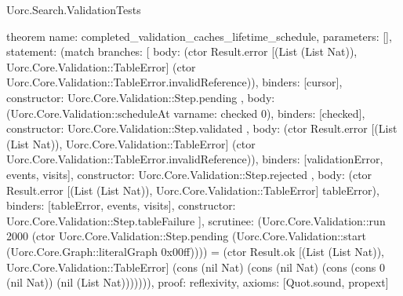 \begin{lexlean}{Uorc.Search.ValidationTests}
\begin{semanticmodule}
theorem{
  name: completed_validation_caches_lifetime_schedule,
  parameters: [],
  statement: (match{
    branches: [
      {
        body: (ctor Result.error [(List (List Nat)), Uorc.Core.Validation::TableError] (ctor Uorc.Core.Validation::TableError.invalidReference)),
        binders: [cursor],
        constructor: Uorc.Core.Validation::Step.pending
      },
      {
        body: (Uorc.Core.Validation::scheduleAt var{name: checked} 0),
        binders: [checked],
        constructor: Uorc.Core.Validation::Step.validated
      },
      {
        body: (ctor Result.error [(List (List Nat)), Uorc.Core.Validation::TableError] (ctor Uorc.Core.Validation::TableError.invalidReference)),
        binders: [validationError, events, visits],
        constructor: Uorc.Core.Validation::Step.rejected
      },
      {
        body: (ctor Result.error [(List (List Nat)), Uorc.Core.Validation::TableError] tableError),
        binders: [tableError, events, visits],
        constructor: Uorc.Core.Validation::Step.tableFailure
      }
    ],
    scrutinee: (Uorc.Core.Validation::run 2000 (ctor Uorc.Core.Validation::Step.pending (Uorc.Core.Validation::start (Uorc.Core.Graph::literalGraph 0x00ff))))
  } = (ctor Result.ok [(List (List Nat)), Uorc.Core.Validation::TableError] (cons (nil Nat) (cons (nil Nat) (cons (cons 0 (nil Nat)) (nil (List Nat))))))),
  proof: reflexivity{},
  axioms: [Quot.sound, propext]
}
\end{semanticmodule}
\end{lexlean}
